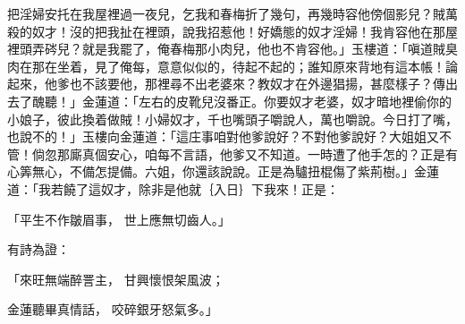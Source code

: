 \begin{showcontents}{}
把淫婦安托在我屋裡過一夜兒，乞我和春梅折了幾句，再幾時容他傍個影兒？賊萬殺的奴才！沒的把我扯在裡頭，說我招惹他！好嬌態的奴才淫婦！我肯容他在那屋裡頭弄硶兒？就是我罷了，俺春梅那小肉兒，他也不肯容他。」玉樓道：「嗔道賊臭肉在那在坐着，見了俺每，意意似似的，待起不起的；誰知原來背地有這本帳！論起來，他爹也不該要他，那裡尋不出老婆來？教奴才在外邊猖揚，甚麼樣子？傳出去了醜聽！」金蓮道：「左右的皮靴兒沒番正。你要奴才老婆，奴才暗地裡偷你的小娘子，彼此換着做賊！小婦奴才，千也嘴頭子嚼說人，萬也嚼說。今日打了嘴，也說不的！」玉樓向金蓮道：「這庄事咱對他爹說好？不對他爹說好？大姐姐又不管！倘忽那廝真個安心，咱每不言語，他爹又不知道。一時遭了他手怎的？正是有心筭無心，不備怎提備。六姐，你還該說說。正是為驢扭棍傷了紫荊樹。」金蓮道：「我若饒了這奴才，除非是他就｛入日｝下我來！正是：

「平生不作皺眉事，  世上應無切齒人。」

有詩為證：

「來旺無端醉詈主，  甘興懷恨架風波；

金蓮聽畢真情話，  咬碎銀牙怒氣多。」


\end{showcontents}
